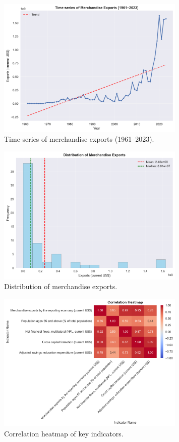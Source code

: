 \documentclass[12pt]{article}
\begin{document}
	\begin{figure}[H]
		\centering
		\includegraphics[width=0.8\textwidth]{../figures/timeseries.png}
		\caption{Time-series of merchandise exports (1961–2023).}
		\label{fig:timeseries}
	\end{figure}
	
	\begin{figure}[H]
		\centering
		\includegraphics[width=0.8\textwidth]{../figures/distribution.png}
		\caption{Distribution of merchandise exports.}
		\label{fig:distribution}
	\end{figure}
	
	\begin{figure}[H]
		\centering
		\includegraphics[width=0.8\textwidth]{../figures/heatmap.png}
		\caption{Correlation heatmap of key indicators.}
		\label{fig:heatmap}
	\end{figure}
	
\end{document}
